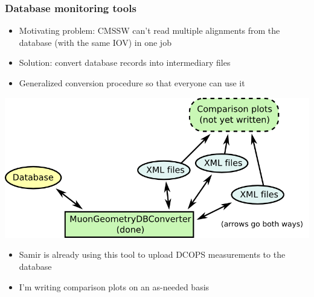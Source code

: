 \documentclass[compress]{beamer}
\begin{document}
\begin{frame}
\frametitle{Database monitoring tools}

\begin{itemize}
\item Motivating problem: CMSSW can't read multiple alignments from the database (with the same IOV) in one job
\item Solution: convert database records into intermediary files
\item Generalized conversion procedure so that everyone can use it
\end{itemize}

\vspace{-0.25 cm}
\begin{center}
\includegraphics[width=0.7\linewidth]{geometryconversion.png}
\end{center}

\vspace{-0.25 cm}
\begin{itemize}
\item Samir is already using this tool to upload DCOPS measurements to the database
\item I'm writing comparison plots on an as-needed basis
\end{itemize}
\end{frame}
\end{document}
